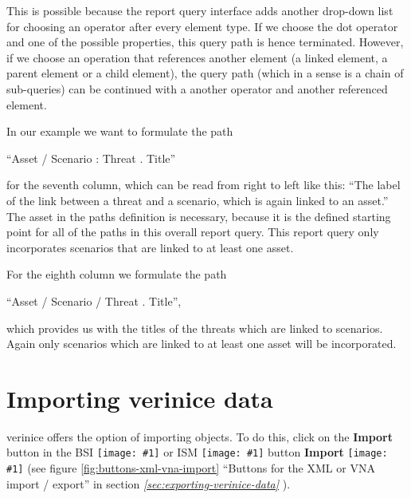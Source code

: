 \documentclass[a4paper,10pt]{book}
\newcommand{\icon}[1]{\texttt{[image: \#1]}}
\begin{document}
This is possible because the report query interface adds another drop-down list
for choosing an operator after every element type. If we choose the dot operator
and one of the possible properties, this query path is hence terminated.
However, if we choose an operation that references another element (a linked
element, a parent element or a child element), the query path (which in a sense
is a chain of sub-queries) can be continued with a another operator and another
referenced element.

In our example we want to formulate the path

``Asset / Scenario : Threat . Title''

for the seventh column, which can be read from right to left like this:
``The label of the link between a threat and a scenario, which is again linked
to an asset.'' The asset in the paths definition is necessary, because it is the
defined starting point for all of the paths in this overall report query. This
report query only incorporates scenarios that are linked to at least one asset.

For the eighth column we formulate the path

``Asset / Scenario / Threat . Title'',

which provides us with the titles of the threats which are linked to
scenarios. Again only scenarios which are linked to at least one asset will be
incorporated.


\section{Importing verinice data}
verinice offers the option of importing objects. To do this, click on the \textbf{Import} button in the
BSI \icon{Icon/GS_Modell.png} or ISM \icon{Icon/Informationssicherheitsmodell.png}
button \textbf{Import} \icon{Icon/Import.png} (see figure \ref{fig:buttons-xml-vna-import} ``Buttons for the XML or VNA import / export''
in section {\em \ref{sec:exporting-verinice-data} }).
\end{document}
